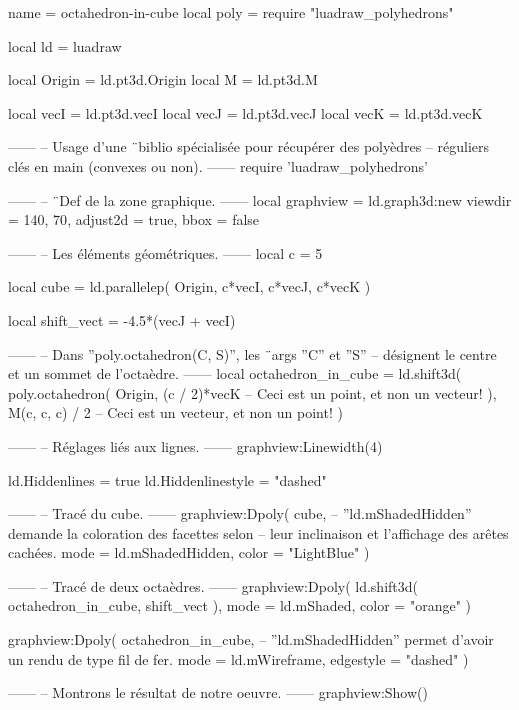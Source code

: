 \documentclass[border = 3pt]{standalone}
\begin{document}
\begin{luadraw*}{name = octahedron-in-cube}
local poly = require "luadraw_polyhedrons"

local ld = luadraw

local Origin = ld.pt3d.Origin
local M      = ld.pt3d.M

local vecI = ld.pt3d.vecI
local vecJ = ld.pt3d.vecJ
local vecK = ld.pt3d.vecK

------
-- Usage d'une ¨biblio spécialisée pour récupérer des polyèdres
-- réguliers clés en main (convexes ou non).
------
require 'luadraw_polyhedrons'

------
-- ¨Def de la zone graphique.
------
local graphview = ld.graph3d:new{
  viewdir  = {140, 70},
  adjust2d = true,
  bbox     = false
}

------
-- Les éléments géométriques.
------
local c = 5

local cube = ld.parallelep(
  Origin,
  c*vecI, c*vecJ, c*vecK
)

local shift_vect = -4.5*(vecJ + vecI)

------
-- Dans ''poly.octahedron(C, S)'', les ¨args ''C'' et ''S''
-- désignent le centre et un sommet de l'octaèdre.
------
local octahedron_in_cube = ld.shift3d(
  poly.octahedron(
    Origin,
    (c / 2)*vecK  -- Ceci est un point, et non un vecteur!
  ),
  M(c, c, c) / 2  -- Ceci est un vecteur, et non un point!
)

------
-- Réglages liés aux lignes.
------
graphview:Linewidth(4)

ld.Hiddenlines     = true
ld.Hiddenlinestyle = "dashed"

------
-- Tracé du cube.
------
graphview:Dpoly(
  cube,
  {
-- ''ld.mShadedHidden'' demande la coloration des facettes selon
-- leur inclinaison et l'affichage des arêtes cachées.
    mode  = ld.mShadedHidden,
    color = "LightBlue"
  }
)

------
-- Tracé de deux octaèdres.
------
graphview:Dpoly(
  ld.shift3d(
    octahedron_in_cube,
    shift_vect
  ),
  {
    mode  = ld.mShaded,
    color = "orange"
  }
)

graphview:Dpoly(
  octahedron_in_cube,
  {
-- ''ld.mShadedHidden'' permet d'avoir un rendu de type fil de fer.
    mode      = ld.mWireframe,
    edgestyle = "dashed"
  }
)

------
-- Montrons le résultat de notre oeuvre.
------
graphview:Show()
\end{luadraw*}
\end{document}
